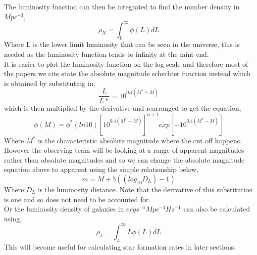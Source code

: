 \documentclass{article}
\begin{document}
\indent The luminosity function can then be integrated to find the number density in $Mpc^{-3}$,
\begin{equation}
\rho_{N}=\int^{\infty}_{L}\phi(L)dL
\end{equation}
Where L is the lower limit luminosity that can be seen in the universe, this is needed as the luminosity function tends to infinity at the faint end.\\
\indent It is easier to plot the luminosity function on the log scale and therefore most of the papers we cite state the absolute magnitude schechter function instead which is obtained by substituting in,
\begin{equation}
\frac{L}{L*}=10^{0.4(M^{*}-M)}
\end{equation}
which is then multiplied by the derivative and rearranged to get the equation,
\begin{equation}
\phi(M)=\phi^{*}(ln10)\left[10^{0.4(M^{*}-M)}\right]^{\alpha+1}exp\left[-10^{0.4(M^{*}-M)}\right]
\end{equation}
Where $M^{*}$ is the characteristic absolute magnitude where the cut off happens.\\
\indent However the observing team will be looking at a range of apparent magnitudes rather than absolute magnitudes and so we can change the absolute magnitude equation above to apparent using the simple relationship below,
\begin{equation}
m=M+5((log_{10}D_{L})-1)
\end{equation}
Where $D_{L}$ is the luminosity distance. Note that the derivative of this substitution is one and so does not need to be accounted for.\\

\indent Or the luminosity density of galaxies in $erg s^{-1}Mpc^{-3}Hz^{-1}$ can also be calculated using,
\begin{equation}
\rho_{L}=\int^{\infty}_{L}L\phi(L)dL
\end{equation}
This will become useful for calculating star formation rates in later sections.\\
\end{document}
